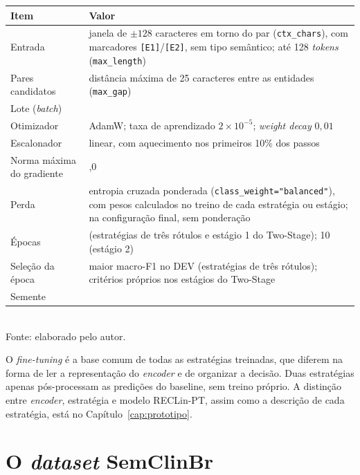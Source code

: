 \begin{quadro}[htbp]
  \centering
  \caption{Hiperparâmetros e configuração do \emph{fine-tuning}, comuns às estratégias treinadas.}
  \label{quad:hiperparametros}
  \small
  \begin{tabular}{l >{\raggedright\arraybackslash}p{8.8cm}}
  \toprule
  Item & Valor \\
  \midrule
  Entrada & janela de $\pm128$ caracteres em torno do par (\texttt{ctx\_chars}), com marcadores \texttt{[E1]}/\texttt{[E2]}, sem tipo semântico; até 128 \emph{tokens} (\texttt{max\_length}) \\
  Pares candidatos & distância máxima de 25 caracteres entre as entidades (\texttt{max\_gap}) \\
  Lote (\emph{batch}) & 64 \\
  Otimizador & AdamW; taxa de aprendizado $2\times10^{-5}$; \emph{weight decay} $0{,}01$ \\
  Escalonador & linear, com aquecimento nos primeiros 10\% dos passos \\
  Norma máxima do gradiente & 1,0 \\
  Perda & entropia cruzada ponderada (\texttt{class\_weight="balanced"}), com pesos calculados no treino de cada estratégia ou estágio; na configuração final, sem ponderação \\
  Épocas & 3 (estratégias de três rótulos e estágio 1 do Two-Stage); 10 (estágio 2) \\
  Seleção da época & maior macro-F1 no DEV (estratégias de três rótulos); critérios próprios nos estágios do Two-Stage \\
  Semente & 42 \\
  \bottomrule
  \end{tabular}\\[4pt]
  {\footnotesize Fonte: elaborado pelo autor.}
\end{quadro}

O \emph{fine-tuning} é a base comum de todas as estratégias treinadas, que diferem na
forma de ler a representação do \emph{encoder} e de organizar a decisão. Duas
estratégias apenas pós-processam as predições do baseline, sem treino próprio. A
distinção entre \emph{encoder}, estratégia e modelo RECLin-PT, assim como a descrição
de cada estratégia, está no Capítulo~\ref{cap:prototipo}.

\section{O \emph{dataset} SemClinBr}
\label{sec:corpus}

